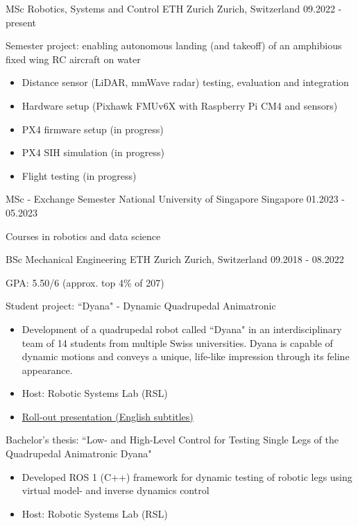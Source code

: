 
\begin{cventries}

    \cventry
    {MSc Robotics, Systems and Control}
    {ETH Zurich}
    {Zurich, Switzerland}
    {09.2022 - present}
    {
    \begin{cvitems}
        \item Semester project: enabling autonomous landing (and takeoff) of an amphibious fixed wing RC aircraft on water
        \begin{itemize}
            \item Distance sensor (LiDAR, mmWave radar) testing, evaluation and integration
            \item Hardware setup (Pixhawk FMUv6X with Raspberry Pi CM4 and sensors)
            \item PX4 firmware setup (in progress)
            \item PX4 SIH simulation (in progress)
            \item Flight testing (in progress)
        \end{itemize}
    \end{cvitems}
    }

    \cventry
    {MSc - Exchange Semester}
    {National University of Singapore}
    {Singapore}
    {01.2023 - 05.2023}
    {
    \begin{cvitems}
        \item Courses in robotics and data science
    \end{cvitems}
    }
  
    \cventry
    {BSc Mechanical Engineering}
    {ETH Zurich}
    {Zurich, Switzerland}
    {09.2018 - 08.2022}
    {
    \begin{cvitems}
        \item GPA: 5.50/6 (approx. top 4\% of 207)
        \item Student project: ``Dyana" - Dynamic Quadrupedal Animatronic
        \begin{itemize}
            \item Development of a quadrupedal robot called ``Dyana" in an interdisciplinary team of 14 students from multiple Swiss universities. Dyana is capable of dynamic motions and conveys a unique, life-like impression through its feline appearance.
            \item Host: Robotic Systems Lab (RSL)
            \item \href{https://www.youtube.com/watch?v=--waMaVgZAg}{Roll-out presentation (English subtitles) \ExternalLink}
        \end{itemize}
        \item Bachelor's thesis: ``Low- and High-Level Control for Testing Single Legs of the Quadrupedal Animatronic Dyana"
        \begin{itemize}
            \item Developed ROS 1 (C++) framework for dynamic testing of robotic legs using virtual model- and inverse dynamics control
            \item Host: Robotic Systems Lab (RSL)
        \end{itemize}
      \end{cvitems}
    }


\end{cventries}
